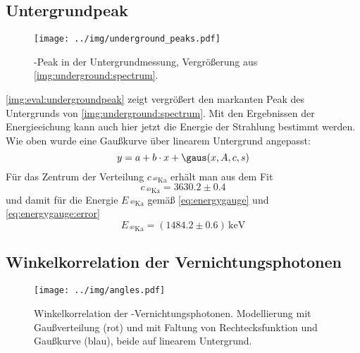 \subsection{Untergrundpeak}
\label{sub:eval:undergroundpeak}

\begin{figure}[H]
\begin{center}
  \texttt{[image: ../img/underground\_peaks.pdf]}
  \caption{-Peak in der Untergrundmessung, Vergrößerung aus \autoref{img:underground:spectrum}.}
  \label{img:eval:undergroundpeak}
\end{center}
\end{figure}

\autoref{img:eval:undergroundpeak} zeigt vergrößert
den markanten Peak des Untergrunds von \autoref{img:underground:spectrum}.
Mit den Ergebnissen der Energieeichung kann auch hier jetzt die Energie der Strahlung bestimmt werden.
Wie oben wurde eine Gaußkurve über linearem Untergrund angepasst:
\begin{equation}
  y = a + b \cdot x + \gaus(x, A, c, s)
\end{equation}
Für das Zentrum der Verteilung $c_{\,{}^{40}\text{Ka}}$ erhält man aus dem Fit
\begin{equation}
  c_{\,{}^{40}\text{Ka}} = 3630.2 \pm 0.4	
\end{equation}
und damit für die Energie $E_{\,{}^{40}\text{Ka}}$ gemäß \autoref{eq:energygauge} und \autoref{eq:energygauge:error}
\begin{equation}
  E_{\,{}^{40}\text{Ka}} = (1484.2 \pm 0.6)\,\text{keV}
\end{equation}
\subsection{Winkelkorrelation der  Vernichtungsphotonen}
\begin{figure}[H]
\begin{center}
  \texttt{[image: ../img/angles.pdf]}
  \caption{Winkelkorrelation der \na-Vernichtungsphotonen.
  Modellierung mit Gaußverteilung (rot) und
  mit Faltung von Rechtecksfunktion und Gaußkurve (blau), beide auf linearem Untergrund.}
  \label{img:angles}
\end{center}
\end{figure}

